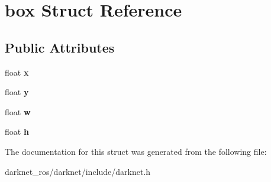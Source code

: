 \hypertarget{structbox}{}\section{box Struct Reference}
\label{structbox}
\subsection*{Public Attributes}
\begin{DoxyCompactItemize}
\item 
\mbox{\label{structbox_a26adb5cfaf492245aba926b2f212b712}} 
float {\bfseries x}
\item 
\mbox{\label{structbox_ab25e5389fd474ccd83c7dfcf0b1f9957}} 
float {\bfseries y}
\item 
\mbox{\label{structbox_abd9b0191e52f22befa76bcf37b9e6477}} 
float {\bfseries w}
\item 
\mbox{\label{structbox_a56959fa604cfb411d0c001be7c444d05}} 
float {\bfseries h}
\end{DoxyCompactItemize}


The documentation for this struct was generated from the following file\+:\begin{DoxyCompactItemize}
\item 
darknet\+\_\+ros/darknet/include/darknet.\+h\end{DoxyCompactItemize}
